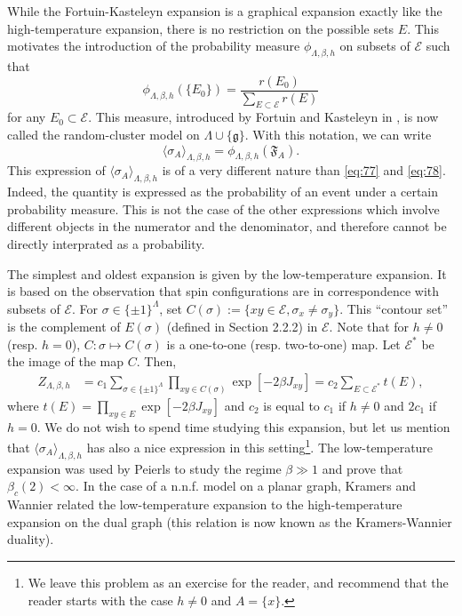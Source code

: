 \documentclass[a4paper,oneside,11pt]{article}
\newcommand{\ee}{\end{equation}}
\newcommand{\be}{\begin{equation}}
\begin{document}
While the Fortuin-Kasteleyn expansion is a graphical expansion exactly like the high-temperature expansion, there is no restriction on the possible sets $E$. This motivates the introduction of the probability measure $\phi_{\Lambda,\beta,h}$ on subsets of $\mathcal E$ such that 
\be\nonumber
\phi_{\Lambda,\beta,h}(\{E_0\})=\frac{r(E_0)}{ \sum_{E\subset\mathcal E} r(E)}
\ee
for any $E_0\subset\mathcal E$. This measure, introduced by Fortuin and Kasteleyn in \cite{ForKas72}, is now called the random-cluster model on $\Lambda\cup\{\mathfrak g\}$. With this notation, we can write
\be\label{eq:79}
\langle\sigma_A\rangle_{\Lambda,\beta,h}=\phi_{\Lambda,\beta,h}(\mathfrak F_A).
\ee
This expression of $\langle\sigma_A\rangle_{\Lambda,\beta,h}$ is of a very different nature than \eqref{eq:77} and \eqref{eq:78}. Indeed, the quantity is expressed as the probability of an event under a certain probability measure. This is not the case of the other expressions which involve different objects in the numerator and the denominator, and therefore cannot be directly interprated as a probability.

\bigbreak
{} The simplest and oldest expansion is given by the low-temperature expansion. It is based on the observation that spin configurations are in correspondence with subsets of $\mathcal E$. For $\sigma\in\{\pm 1\}^{\Lambda}$, set $C(\sigma):=\{xy\in\mathcal E,\sigma_x\ne\sigma_y\}$. This ``contour set'' is the complement of $E(\sigma)$ (defined in Section 2.2.2) in $\mathcal E$. Note that for $h\ne 0$ (resp. $h=0$), $C:\sigma\longmapsto C(\sigma)$ is a one-to-one (resp. two-to-one) map. Let $\mathcal E^*$ be the image of the map $C$. Then,
\begin{align*}
Z_{\Lambda,\beta,h}&=c_1\sum_{\sigma\in\{\pm 1\}^{\Lambda}}\prod_{xy\in C(\sigma)}\exp[-2\beta J_{xy}]=c_2\sum_{E\subset \mathcal E^*}t(E),\end{align*}
where $t(E)=\prod_{xy\in E}\exp[-2\beta J_{xy}]$ and  $c_2$ is equal to $c_1$ if $h\ne0$ and $2c_1$ if $h=0$. We do not wish to spend time studying this expansion, but let us mention that $\langle\sigma_A\rangle_{\Lambda,\beta,h}$ has also a nice expression in this setting\footnote{We leave this problem as an exercise for the reader, and recommend that the reader starts with the case $h\ne 0$ and $A=\{x\}$.}.
The low-temperature expansion was used by Peierls \cite{Pei36} to study the regime $\beta\gg1$ and prove that  $\beta_c(2)<\infty$. In the case of a n.n.f. model on a planar graph, Kramers and Wannier \cite{KraWan41} related the low-temperature expansion to the high-temperature expansion on the dual graph (this relation is now known as the Kramers-Wannier duality).
\end{document}
